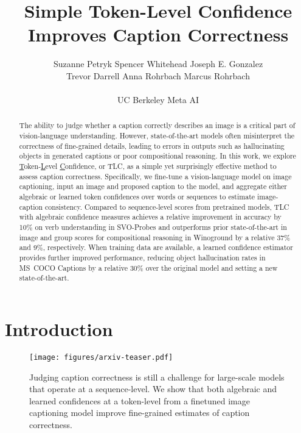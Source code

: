 \documentclass[10pt,twocolumn,letterpaper]{article}
\newcommand{\ApproachNameLong}{\underline{T}oken-\underline{L}evel \underline{C}onfidence\xspace}
\begin{document}
\title{Simple Token-Level Confidence Improves Caption Correctness}

 \author{Suzanne Petryk \qquad
Spencer Whitehead \qquad
Joseph E. Gonzalez \qquad \\
Trevor Darrell \qquad
Anna Rohrbach \qquad
Marcus Rohrbach \\ \\
\vspace{-.5em}
 UC Berkeley \qquad  Meta AI
\vspace{-.8em}
}


\maketitle
\ificcvfinal\thispagestyle{empty}\fi


\begin{abstract}


The ability to judge whether a caption correctly describes an image is a critical part of vision-language understanding. However, state-of-the-art models often misinterpret the correctness of fine-grained details, leading to errors in outputs such as hallucinating objects in generated captions or poor compositional reasoning. In this work, we explore \ApproachNameLong, or TLC, as a simple yet surprisingly effective method to assess caption correctness. Specifically, we fine-tune a vision-language model on image captioning, input an image and proposed caption to the model, and aggregate either algebraic or learned token confidences over words or sequences to estimate image-caption consistency. Compared to sequence-level scores from pretrained models, TLC with algebraic confidence measures achieves a relative improvement in accuracy by 10\% on verb understanding in SVO-Probes and outperforms prior state-of-the-art in image and group scores for compositional reasoning in Winoground by a relative 37\% and 9\%, respectively. When training data are available, a learned confidence estimator provides further improved performance, reducing object hallucination rates in MS~COCO Captions by a relative 30\% over the original model and setting a new state-of-the-art. 

\end{abstract}

\section{Introduction}
\label{sec:intro}

\begin{figure}[t]
  \centering
   \texttt{[image: figures/arxiv-teaser.pdf]}
   \caption{Judging caption correctness is still a challenge for large-scale models that operate at a sequence-level. We show that both algebraic and learned confidences at a token-level from a finetuned image captioning model improve fine-grained estimates of caption correctness.
   }
   \label{fig:teaser}
\end{figure} 
\end{document}
